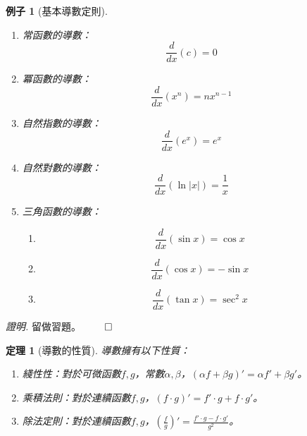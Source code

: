 \documentclass[12pt]{article}
\newtheorem*{theorem}{定理}
\newtheorem*{example}{例子}
\renewenvironment*{proof}{\textit{證明.}}{\hfill$\qed$}
\begin{document}
    \begin{example}[基本導數定則]
        \begin{enumerate}
            \item 常函數的導數：$$\frac{d}{dx}(c)=0$$
            \item 冪函數的導數：$$\frac{d}{dx}(x^n)=nx^{n-1}$$
            \item 自然指數的導數：$$\frac{d}{dx}(e^x)=e^x$$
            \item 自然對數的導數：$$\frac{d}{dx}(\ln|x|)=\dfrac{1}{x}$$
            \item 三角函數的導數：\begin{enumerate}
                \item $$\frac{d}{dx}(\sin{x})=\cos{x}$$
                \item $$\frac{d}{dx}(\cos{x})=-\sin{x}$$
                \item $$\frac{d}{dx}(\tan{x})=\sec^2{x}$$
            \end{enumerate}
        \end{enumerate}
    \end{example}

    \begin{proof}
        留做習題。
    \end{proof}

    \begin{theorem}[導數的性質]
        導數擁有以下性質：\begin{enumerate}
            \item 綫性性：對於可微函數$f,g$，常數$\alpha,\beta$，$(\alpha f+\beta g)'=\alpha f' + \beta g'$。
            \item 乘積法則：對於連續函數$f,g$，$(f\cdot g)'=f'\cdot g + f\cdot g'$。
            \item 除法定則：對於連續函數$f,g$，$(\frac{f}{g})'=\frac{f'\cdot g-f\cdot g'}{g^2}$。
        \end{enumerate}
    \end{theorem}
\end{document}
